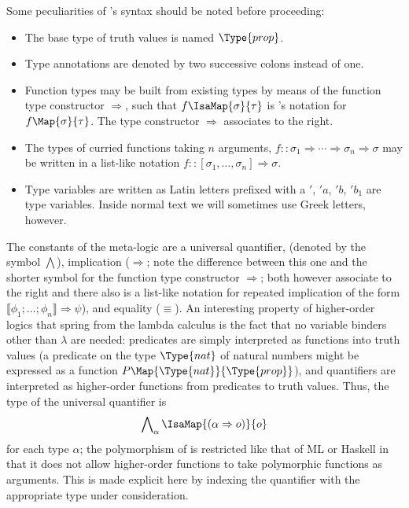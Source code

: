 Some peculiarities of \Isabelle's syntax should be noted before proceeding: 
\begin{itemize}
\item The base type of truth values is named $\Type{prop}$.
\item Type annotations are denoted by two successive colons instead of one.
\item Function types may be built from existing types by means of the function
  type constructor $\Rightarrow$, such that $f \IsaMap{\sigma}{\tau}$ is \Isabelle's notation for
  $f\Map{\sigma}{\tau}$. The type constructor $\Rightarrow$ associates to the right.
\item The types of curried functions taking $n$ arguments, $f :: \sigma_1 \Rightarrow \cdots \Rightarrow \sigma_n \Rightarrow
  \sigma$ may be written in a list-like notation $f :: [\sigma_1,\ldots,\sigma_n] \Rightarrow \sigma$.
\item Type variables are written as Latin letters prefixed with a $'$, \EG $'a$,
  $'b$, $'b_1$ are type variables. Inside normal text we will sometimes use
  Greek letters, however.
\end{itemize}

The constants of the meta-logic are a universal quantifier, (denoted by the
symbol $\bigwedge$), implication ($\Longrightarrow$; note the difference between this one and the
shorter symbol for the function type constructor $\Rightarrow$; both however associate to
the right and there also is a list-like notation for repeated implication of
the form $\llbracket\phi_1;\ldots;\phi_n\rrbracket \Longrightarrow \psi$), and equality ($\equiv$). An interesting property of
higher-order logics that spring from the lambda calculus is the fact that no
variable binders other than $\lambda$ are needed: predicates are simply interpreted as
functions into truth values (\EG a predicate on the type $\Type{nat}$ of natural
numbers might be expressed as a function $P \Map{\Type{nat}}{\Type{prop}}$), and
quantifiers are interpreted as higher-order functions from predicates to truth
values. Thus, the type of the universal quantifier is
\begin{equation}
  \label{eq:univ-quant-type}
  \bigwedge\nolimits_\alpha \IsaMap{(\alpha \Rightarrow o)}{o}
\end{equation}
for each type $\alpha$; the polymorphism of \Isabelle is restricted like that of
ML or Haskell in that it does not allow higher-order functions to take
polymorphic functions as arguments. This is made explicit here by indexing the
quantifier with the appropriate type under consideration.



